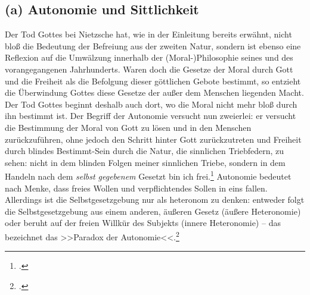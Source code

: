 \documentclass[12pt, a4paper, openany]{report}
\begin{document}
\subsection{(a) Autonomie und Sittlichkeit}
Der Tod Gottes bei Nietzsche hat, wie in der Einleitung bereits erwähnt, nicht bloß die Bedeutung der Befreiung aus der zweiten Natur, sondern ist ebenso eine Reflexion auf die Umwälzung innerhalb der (Moral-)Philosophie seines und des vorangegangenen Jahrhunderts. 
Waren doch die Gesetze der Moral durch Gott und die Freiheit als die Befolgung dieser göttlichen Gebote bestimmt, so entzieht die Überwindung Gottes diese Gesetze der außer dem Menschen liegenden Macht.
Der Tod Gottes beginnt deshalb auch dort, wo die Moral nicht mehr bloß durch ihn bestimmt ist. 
Der Begriff der Autonomie versucht nun zweierlei: 
er versucht die Bestimmung der Moral von Gott zu lösen und in den Menschen zurückzuführen, ohne jedoch den Schritt hinter Gott zurückzutreten und Freiheit durch blindes Bestimmt-Sein durch die Natur, die sinnlichen Triebfedern, zu sehen: nicht in dem blinden Folgen meiner sinnlichen Triebe, sondern in dem Handeln nach dem \emph{selbst gegebenem} Gesetzt bin ich frei.\footcite[Vgl.][19]{menke_autonomie_2018}
Autonomie bedeutet nach Menke, dass freies Wollen und verpflichtendes Sollen in eins fallen.
Allerdings ist die Selbstgesetzgebung nur als heteronom zu denken:  
entweder folgt die Selbstgesetzgebung aus einem anderen, äußeren Gesetz (äußere Heteronomie) oder beruht auf der freien Willkür des Subjekts (innere Heteronomie) -- das bezeichnet das >>Paradox der Autonomie<<.\footcite[Vgl.][S. 19 - S. 20.]{menke_autonomie_2018}
\end{document}
